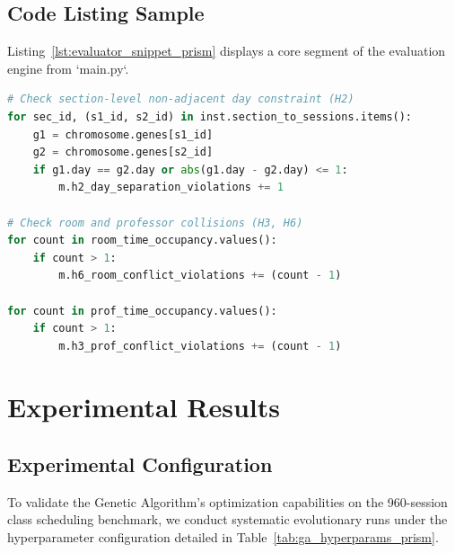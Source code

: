 \documentclass[12pt,a4paper]{report}
\begin{document}
\section{Code Listing Sample}
Listing~\ref{lst:evaluator_snippet_prism} displays a core segment of the evaluation engine from `main.py`.

\begin{lstlisting}[language=Python, caption={Core Evaluation Loop in `ScheduleEvaluator`}, label={lst:evaluator_snippet_prism}]
# Check section-level non-adjacent day constraint (H2)
for sec_id, (s1_id, s2_id) in inst.section_to_sessions.items():
    g1 = chromosome.genes[s1_id]
    g2 = chromosome.genes[s2_id]
    if g1.day == g2.day or abs(g1.day - g2.day) <= 1:
        m.h2_day_separation_violations += 1

# Check room and professor collisions (H3, H6)
for count in room_time_occupancy.values():
    if count > 1:
        m.h6_room_conflict_violations += (count - 1)

for count in prof_time_occupancy.values():
    if count > 1:
        m.h3_prof_conflict_violations += (count - 1)
\end{lstlisting}

\chapter{Experimental Results}

\section{Experimental Configuration}
To validate the Genetic Algorithm's optimization capabilities on the 960-session class scheduling benchmark, we conduct systematic evolutionary runs under the hyperparameter configuration detailed in Table~\ref{tab:ga_hyperparams_prism}.
\end{document}
